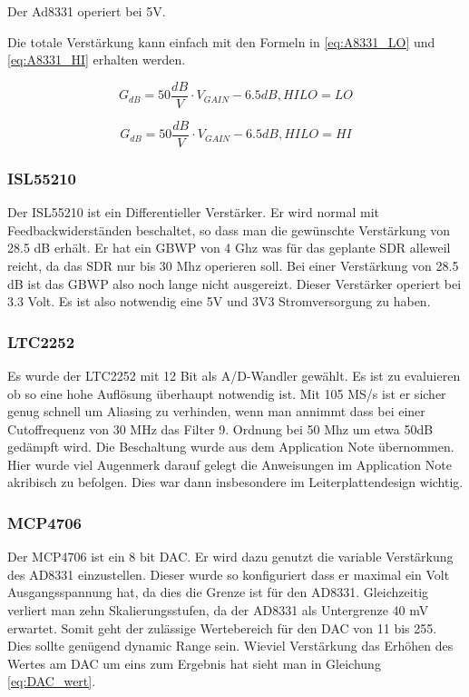 Der Ad8331 operiert bei 5V.

Die totale Verstärkung kann einfach mit den Formeln in \ref{eq:A8331_LO} und \ref{eq:A8331_HI} erhalten werden.

\begin{equation}
    G_{dB} = 50 \frac{dB}{V} \cdot V_{GAIN} - 6.5 dB, HILO = LO
\label{eq:A8331_LO}
\end{equation}

\begin{equation}
    G_{dB} = 50 \frac{dB}{V} \cdot V_{GAIN} - 6.5 dB, HILO = HI
\label{eq:A8331_HI}
\end{equation}

\subsubsection{ISL55210}
Der ISL55210\cite{ISL55210} ist ein Differentieller Verstärker. Er wird normal mit Feedbackwiderständen beschaltet, so dass man die gewünschte Verstärkung von 28.5 dB erhält.
Er hat ein GBWP von 4 Ghz was für das geplante SDR alleweil reicht, da das SDR nur bis 30 Mhz operieren soll. Bei einer Verstärkung von 28.5 dB ist das GBWP also noch lange nicht ausgereizt.
Dieser Verstärker operiert bei 3.3 Volt. Es ist also notwendig eine 5V und 3V3 Stromversorgung zu haben.

\subsubsection{LTC2252}
Es wurde der LTC2252\cite{LTC2252} mit 12 Bit als A/D-Wandler gewählt. Es ist zu evaluieren ob so eine hohe Auflösung überhaupt notwendig ist.
Mit 105 MS/s ist er sicher genug schnell um Aliasing zu verhinden, wenn man annimmt dass bei einer Cutoffrequenz von 30 MHz das Filter 9. Ordnung bei 50 Mhz um etwa 50dB gedämpft wird.
Die Beschaltung wurde aus dem Application Note übernommen. Hier wurde viel Augenmerk darauf gelegt die Anweisungen im Application Note akribisch zu befolgen. Dies war dann insbesondere im Leiterplattendesign wichtig.

\subsubsection{MCP4706}
\label{subsec:MCP4706}
Der MCP4706\cite{MCP4706} ist ein 8 bit DAC. Er wird dazu genutzt die variable Verstärkung des AD8331 einzustellen. Dieser wurde so konfiguriert dass er maximal ein Volt Ausgangsspannung hat, da dies die Grenze ist für den AD8331. Gleichzeitig verliert man zehn Skalierungsstufen, da der AD8331 als Untergrenze 40 mV erwartet. Somit geht der zulässige Wertebereich für den DAC von 11 bis 255. Dies sollte genügend dynamic Range sein. Wieviel Verstärkung das Erhöhen des Wertes am DAC um eins zum Ergebnis hat sieht man in Gleichung \ref{eq:DAC_wert}.

